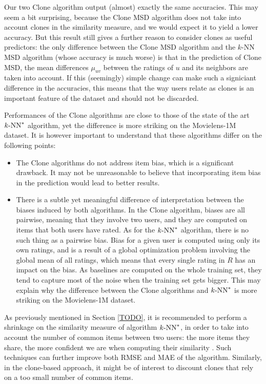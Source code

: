 Our two Clone algorithm output (almost) exactly the same
accuracies. This may seem a bit surprising, because the Clone MSD algorithm
does not take into account clones in the similarity measure, and we would
expect it to yield a lower accuracy. But this result still gives a further
reason to consider clones as useful predictors: the only difference between the
Clone MSD algorithm and the $k$-NN MSD algorithm (whose accuracy is much worse)
is that in the prediction of Clone MSD, the mean differences $\mu_{uv}$ between
the ratings of $u$ and its neighbors are taken into account. If this
(seemingly) simple change can make such a signiciant difference in the
accuracies, this means that the way users relate as clones is an important
feature of the dataset and should not be discarded.

Performances of the Clone algorithms are close to those of the state of the
art $k\text{-NN}^*$ algorithm, yet the difference is more striking on the Movielens-1M
dataset. It is however important to understand that these algorithms differ on
the following points:
\begin{itemize}
\item The Clone algorithms do not address item bias, which is a significant
  drawback. It may not be unreasonable to believe that incorporating item bias
  in the prediction would lead to better results.
\item There is a subtle yet meaningful difference of interpretation between the
  biases induced by both algorithms. In the Clone algorithm, biases are all
  pairwise, meaning that they involve two users, and they are computed on items
  that both users have rated. As for the $k\text{-NN}^*$ algorithm, there is no such
  thing as a pairwise bias. Bias for a given user is computed using only its
  own ratings, and is a result of a global optimization problem involving the
  global mean of all ratings, which means that every single rating in $R$ has
  an impact on the bias. As baselines are computed on the whole training set,
    they tend to capture most of the noise when the training set gets bigger.
    This may explain why the difference between the Clone algorithms and
    $k\text{-NN}^*$ is more striking on the Movielens-1M dataset.
\end{itemize}

As previously mentioned in Section \ref{TODO}, it is recommended to perform a
shrinkage on the similarity measure of algorithm $k\text{-NN}^*$, in order to take into
account the number of common items between two users: the more items they
share, the more confident we are when computing their similarity
\cite{KorACM2010}. Such techniques can further improve both RMSE and MAE of the
algorithm.  Similarly, in the clone-based approach, it might be of interest to
discount clones that rely on a too small number of common items.

